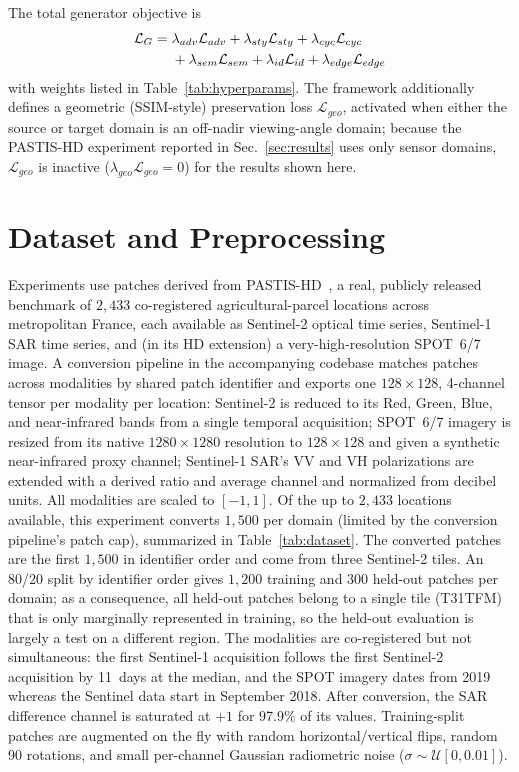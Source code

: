 \documentclass[runningheads]{llncs}
\begin{document}
The total generator objective is
\begin{align}
\mathcal{L}_G ={}& \lambda_{adv}\mathcal{L}_{adv} + \lambda_{sty}\mathcal{L}_{sty} + \lambda_{cyc}\mathcal{L}_{cyc} \notag \\
& + \lambda_{sem}\mathcal{L}_{sem} + \lambda_{id}\mathcal{L}_{id} + \lambda_{edge}\mathcal{L}_{edge}
\label{eq:total}
\end{align}
with weights listed in Table~\ref{tab:hyperparams}. The framework additionally defines a geometric (SSIM-style) preservation loss $\mathcal{L}_{geo}$, activated when either the source or target domain is an off-nadir viewing-angle domain; because the PASTIS-HD experiment reported in Sec.~\ref{sec:results} uses only sensor domains, $\mathcal{L}_{geo}$ is inactive ($\lambda_{geo}\mathcal{L}_{geo}=0$) for the results shown here.

\section{Dataset and Preprocessing}
\label{sec:dataset}
Experiments use patches derived from PASTIS-HD~\cite{garnot2021panoptic,astruc2024omnisat}, a real, publicly released benchmark of $2{,}433$ co-registered agricultural-parcel locations across metropolitan France, each available as Sentinel-2 optical time series, Sentinel-1 SAR time series, and (in its HD extension) a very-high-resolution SPOT~6/7 image. A conversion pipeline in the accompanying codebase matches patches across modalities by shared patch identifier and exports one $128\times128$, 4-channel tensor per modality per location: Sentinel-2 is reduced to its Red, Green, Blue, and near-infrared bands from a single temporal acquisition; SPOT~6/7 imagery is resized from its native $1280\times1280$ resolution to $128\times128$ and given a synthetic near-infrared proxy channel; Sentinel-1 SAR's VV and VH polarizations are extended with a derived ratio and average channel and normalized from decibel units. All modalities are scaled to $[-1,1]$. Of the up to $2{,}433$ locations available, this experiment converts $1{,}500$ per domain (limited by the conversion pipeline's patch cap), summarized in Table~\ref{tab:dataset}. The converted patches are the first $1{,}500$ in identifier order and come from three Sentinel-2 tiles. An 80/20 split by identifier order gives $1{,}200$ training and $300$ held-out patches per domain; as a consequence, all held-out patches belong to a single tile (T31TFM) that is only marginally represented in training, so the held-out evaluation is largely a test on a different region. The modalities are co-registered but not simultaneous: the first Sentinel-1 acquisition follows the first Sentinel-2 acquisition by 11~days at the median, and the SPOT imagery dates from 2019 whereas the Sentinel data start in September 2018. After conversion, the SAR difference channel is saturated at $+1$ for 97.9\% of its values. Training-split patches are augmented on the fly with random horizontal/vertical flips, random 90\textdegree{} rotations, and small per-channel Gaussian radiometric noise ($\sigma \sim \mathcal{U}[0, 0.01]$).
\end{document}
